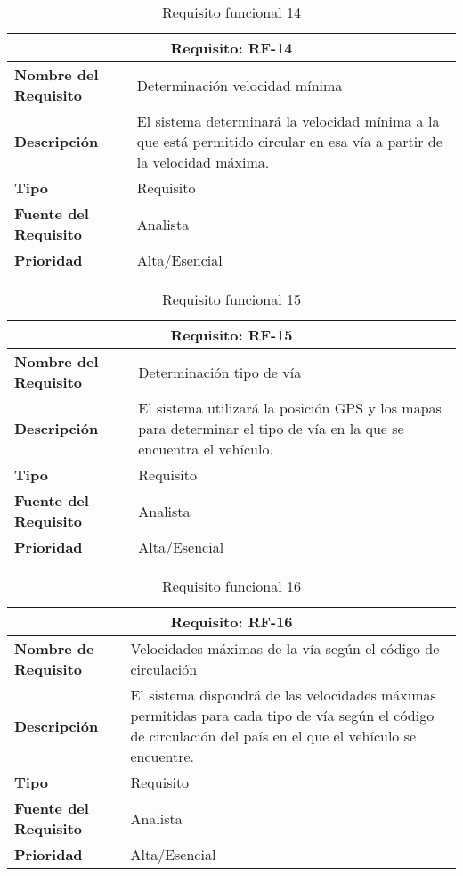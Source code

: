 \begin{table}[H]
\begin{center}
\begin{tabular}{p{} p{7cm}}
\multicolumn{2}{c}{\textbf{Requisito: RF-14} } \\
\hline \hline
\textbf{Nombre del Requisito} & Determinación velocidad mínima \\
\hline
\textbf{Descripción} &  El sistema determinará la velocidad mínima a la que está permitido circular en esa vía a partir de la velocidad máxima.\\
\hline
\textbf{Tipo} & Requisito \\
\hline
\textbf{Fuente del Requisito} & Analista \\
\hline
\textbf{Prioridad} & Alta/Esencial \\ \hline
\end{tabular}
\caption{Requisito funcional 14}
\label{tab:RF-14}
\end{center}
\end{table}

\begin{table}[H]
\begin{center}
\begin{tabular}{p{} p{7cm}}
\multicolumn{2}{c}{\textbf{Requisito: RF-15} } \\
\hline \hline
\textbf{Nombre del Requisito} & Determinación tipo de vía \\
\hline
\textbf{Descripción} & El sistema utilizará la posición GPS y los mapas para determinar el tipo de vía en la que se encuentra el vehículo. \\
\hline
\textbf{Tipo} & Requisito \\
\hline
\textbf{Fuente del Requisito} & Analista \\
\hline
\textbf{Prioridad} & Alta/Esencial \\ \hline
\end{tabular}
\caption{Requisito funcional 15}
\label{tab:RF-15}
\end{center}
\end{table}

\begin{table}[H]
\begin{center}
\begin{tabular}{p{} p{7cm}}
\multicolumn{2}{c}{\textbf{Requisito: RF-16} } \\
\hline \hline
\textbf{Nombre de Requisito} & Velocidades máximas de la vía según el código de circulación  \\
\hline
\textbf{Descripción} & El sistema dispondrá de las velocidades máximas permitidas para cada tipo de vía según el código de circulación del país en el que el vehículo se encuentre. \\
\hline
\textbf{Tipo} & Requisito \\
\hline
\textbf{Fuente del Requisito} & Analista \\
\hline
\textbf{Prioridad} & Alta/Esencial \\ \hline
\end{tabular}
\caption{Requisito funcional 16}
\label{tab:RF-16}
\end{center}
\end{table}



